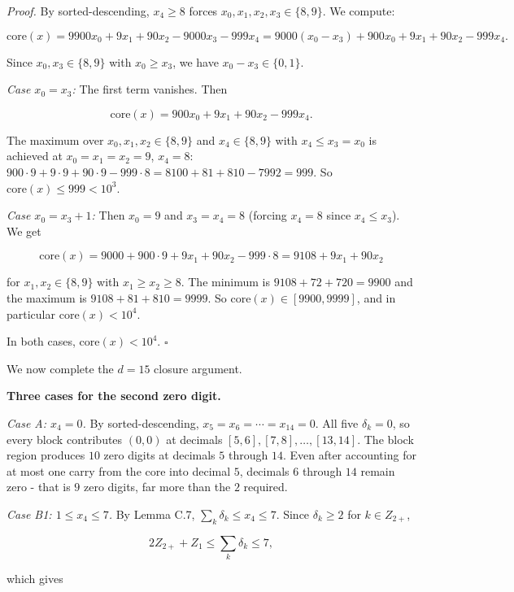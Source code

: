 \documentclass[11pt,letterpaper]{article}
\theoremstyle{paperstyle}
\theoremstyle{paperstyledef}
\theoremstyle{paperstylerem}
\begin{document}
\emph{Proof.} By sorted-descending, \(x_4 \geq 8\) forces
\(x_0, x_1, x_2, x_3 \in \{8, 9\}\). We compute:

\[\mathrm{core}(x) = 9900 x_0 + 9 x_1 + 90 x_2 - 9000 x_3 - 999 x_4 = 9000(x_0 - x_3) + 900 x_0 + 9 x_1 + 90 x_2 - 999 x_4.\]

Since \(x_0, x_3 \in \{8, 9\}\) with \(x_0 \geq x_3\), we have
\(x_0 - x_3 \in \{0, 1\}\).

\emph{Case \(x_0 = x_3\):} The first term vanishes. Then

\[\mathrm{core}(x) = 900 x_0 + 9 x_1 + 90 x_2 - 999 x_4.\]

The maximum over \(x_0, x_1, x_2 \in \{8, 9\}\) and \(x_4 \in \{8, 9\}\)
with \(x_4 \leq x_3 = x_0\) is achieved at \(x_0 = x_1 = x_2 = 9\),
\(x_4 = 8\):
\(900 \cdot 9 + 9 \cdot 9 + 90 \cdot 9 - 999 \cdot 8 = 8100 + 81 + 810 - 7992 = 999\).
So \(\mathrm{core}(x) \leq 999 < 10^3\).

\emph{Case \(x_0 = x_3 + 1\):} Then \(x_0 = 9\) and \(x_3 = x_4 = 8\)
(forcing \(x_4 = 8\) since \(x_4 \leq x_3\)). We get

\[\mathrm{core}(x) = 9000 + 900 \cdot 9 + 9 x_1 + 90 x_2 - 999 \cdot 8 = 9108 + 9 x_1 + 90 x_2\]

for \(x_1, x_2 \in \{8, 9\}\) with \(x_1 \geq x_2 \geq 8\). The minimum
is \(9108 + 72 + 720 = 9900\) and the maximum is
\(9108 + 81 + 810 = 9999\). So \(\mathrm{core}(x) \in [9900, 9999]\),
and in particular \(\mathrm{core}(x) < 10^4\).

In both cases, \(\mathrm{core}(x) < 10^4\). \(\square\)

We now complete the \(d = 15\) closure argument.

\textbf{Three cases for the second zero digit.}

\emph{Case A: \(x_4 = 0\).} By sorted-descending,
\(x_5 = x_6 = \cdots = x_{14} = 0\). All five \(\delta_k = 0\), so every
block contributes \((0, 0)\) at decimals
\([5, 6], [7, 8], \ldots, [13, 14]\). The block region produces \(10\)
zero digits at decimals \(5\) through \(14\). Even after accounting for
at most one carry from the core into decimal \(5\), decimals \(6\)
through \(14\) remain zero - that is \(9\) zero digits, far more than
the \(2\) required.

\emph{Case B1: \(1 \leq x_4 \leq 7\).} By Lemma C.7,
\(\sum_k \delta_k \leq x_4 \leq 7\). Since \(\delta_k \geq 2\) for
\(k \in Z_{2+}\),

\[2 Z_{2+} + Z_1 \leq \sum_k \delta_k \leq 7,\]

which gives
\end{document}
